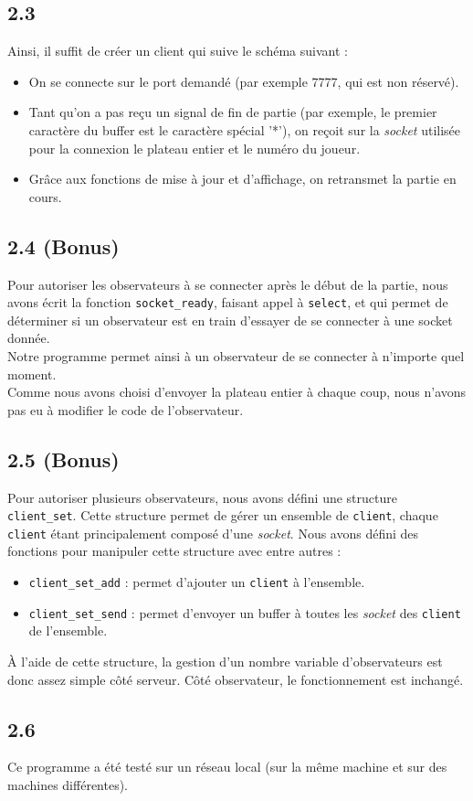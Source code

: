 \documentclass[12pt]{article}
\def\question#1{\subsection{#1}}
\begin{document}
\question{2.3}
Ainsi, il suffit de créer un client qui suive le schéma suivant :
\begin{itemize}
\item On se connecte sur le port demandé (par exemple 7777, qui est non réservé).
\item Tant qu'on a pas reçu un signal de fin de partie (par exemple, le premier caractère du buffer est le caractère spécial '*'), on reçoit sur la \textit{socket} utilisée pour la connexion le plateau entier et le numéro du joueur.
\item Grâce aux fonctions de mise à jour et d'affichage, on retransmet la partie en cours.
\end{itemize}

  

\question{2.4 (Bonus)}
Pour autoriser les observateurs à se connecter après le début de la partie, nous avons écrit la fonction \texttt{socket\_ready}, faisant appel à \texttt{select}, et qui permet de déterminer si un observateur est en train d'essayer de se connecter à une socket donnée. \\
Notre programme permet ainsi à un observateur de se connecter à n'importe quel moment. \\
Comme nous avons choisi d'envoyer la plateau entier à chaque coup, nous n'avons pas eu à modifier le code de l'observateur.



\question{2.5 (Bonus)}
Pour autoriser plusieurs observateurs, nous avons défini une structure \texttt{client\_set}. Cette structure permet de gérer un ensemble de \texttt{client}, chaque \texttt{client} étant principalement composé d'une \textit{socket}. Nous avons défini des fonctions pour manipuler cette structure avec entre autres :
\begin{itemize}
\item \texttt{client\_set\_add} : permet d'ajouter un \texttt{client} à l'ensemble.
\item \texttt{client\_set\_send} : permet d'envoyer un buffer à toutes les \textit{socket} des \texttt{client} de l'ensemble.
\end{itemize}
À l'aide de cette structure, la gestion d'un nombre variable d'observateurs est donc assez simple côté serveur. Côté observateur, le fonctionnement est inchangé.



\question{2.6}

Ce programme a été testé sur un réseau local (sur la même machine et sur des machines différentes).
\end{document}
